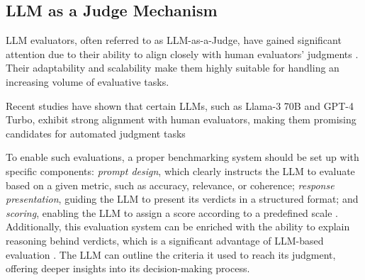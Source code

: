 \subsection{LLM as a Judge Mechanism}

LLM evaluators, often referred to as LLM-as-a-Judge, have gained significant attention due to their ability to align closely with human evaluators' judgments \cite{zhu2023judgelm, shi2024judging}. Their adaptability and scalability make them highly suitable for handling an increasing volume of evaluative tasks. 

Recent studies have shown that certain LLMs, such as Llama-3 70B and GPT-4 Turbo, exhibit strong alignment with human evaluators, making them promising candidates for automated judgment tasks \cite{thakur2024judging}

To enable such evaluations, a proper benchmarking system should be set up with specific components: \emph{prompt design}, which clearly instructs the LLM to evaluate based on a given metric, such as accuracy, relevance, or coherence; \emph{response presentation}, guiding the LLM to present its verdicts in a structured format; and \emph{scoring}, enabling the LLM to assign a score according to a predefined scale \cite{ibtasham2024towards}. Additionally, this evaluation system can be enriched with the ability to explain reasoning behind verdicts, which is a significant advantage of LLM-based evaluation \cite{zheng2023judging}. The LLM can outline the criteria it used to reach its judgment, offering deeper insights into its decision-making process.




